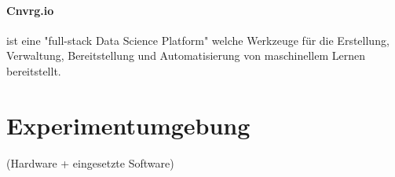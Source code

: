 		\paragraph{Cnvrg.io}  ist eine "full-stack Data Science Platform" welche Werkzeuge  für die Erstellung, Verwaltung, Bereitstellung  und Automatisierung von maschinellem Lernen bereitstellt. 
			
	\section{Experimentumgebung}
	\label{sec:Experimentumgebung}
		(Hardware + eingesetzte Software)